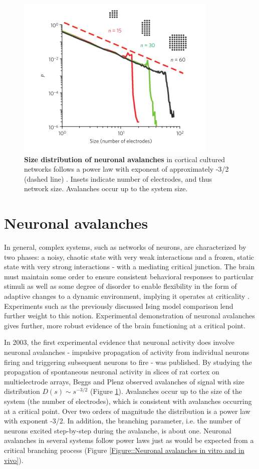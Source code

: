 \documentclass[12pt]{article}
\begin{document}
\begin{figure}      
  \begin{center}    
 \includegraphics[width=.6\textwidth]{originalavalancheplenz}    
    \caption{\textbf{Size distribution of neuronal avalanches} in cortical cultured networks follows a power law with exponent of approximately -3/2 (dashed line) \cite{Beggs2003b}. Insets indicate number of electrodes, and thus network size. Avalanches occur up to the system size.}
   \label{Figure::Neuronal Avalanches}   
  \end{center}     
   \end{figure}
   
\section*{Neuronal avalanches}

In general, complex systems, such as networks of neurons, are characterized by two phases: a noisy, chaotic state with very weak interactions and a frozen, static state with very strong interactions - with a mediating critical junction. The brain must maintain some order to ensure consistent behavioral responses to particular stimuli as well as some degree of disorder to enable flexibility in the form of adaptive changes to a dynamic environment, implying it operates at criticality \cite{Bak1987a}. Experiments such as the previously discussed Ising model comparison lend further weight to this notion. Experimental demonstration of neuronal avalanches gives further, more robust evidence of the brain functioning at a critical point.

In 2003, the first experimental evidence that neuronal activity does involve neuronal avalanches - impulsive propagation of activity from individual neurons firing and triggering subsequent neurons to fire - was published\cite{Beggs2003b}. By studying the propagation of spontaneous neuronal activity in slices of rat cortex on multielectrode arrays, Beggs and Plenz observed avalanches of signal with size distribution $ D(s) \sim s^{-3/2} $ (Figure \ref{Figure::Neuronal Avalanches}). Avalanches occur up to the size of the system (the number of electrodes), which is consistent with avalanches occurring at a critical point. Over two orders of magnitude the distribution is a power law with exponent -3/2. In addition, the branching parameter, i.e. the number of neurons excited step-by-step during the avalanche, is about one. Neuronal avalanches in several systems follow power laws just as would be expected from a critical branching process (Figure \ref{Figure::Neuronal avalanches in vitro and in vivo}).
   
\end{document}
